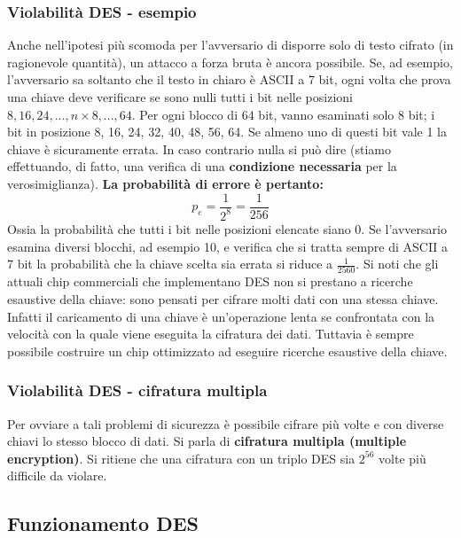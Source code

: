 \subsubsection{Violabilità DES - esempio}
Anche nell'ipotesi più scomoda per l'avversario di disporre solo di testo cifrato (in ragionevole quantità), un attacco a forza bruta è ancora possibile. Se, ad esempio, l'avversario sa soltanto che il testo in chiaro è ASCII a 7 bit, ogni volta che prova una chiave deve verificare se sono nulli tutti i bit nelle posizioni $8, 16, 24, ..., n \times 8, ..., 64$. Per ogni blocco di 64 bit, vanno esaminati solo 8 bit; i bit in posizione 8, 16, 24, 32, 40, 48, 56, 64. Se almeno uno di questi bit vale 1 la chiave è sicuramente errata. In caso contrario nulla si può dire (stiamo effettuando, di fatto, una verifica di una \textbf{condizione necessaria} per la verosimiglianza). \textbf{La probabilità di errore è pertanto:}
\begin{equation}
p_e = \frac{1}{2^8} = \frac{1}{256}
\end{equation}
Ossia la probabilità che tutti i bit nelle posizioni elencate siano 0. Se l'avversario esamina diversi blocchi, ad esempio 10, e verifica che si tratta sempre di ASCII a 7 bit la probabilità che la chiave scelta sia errata si riduce a $\frac{1}{2560}$. Si noti che gli attuali chip commerciali che implementano DES non si prestano a ricerche esaustive della chiave: sono pensati per cifrare molti dati con una stessa chiave. Infatti il caricamento di una chiave è un'operazione lenta se confrontata con la velocità con la quale viene eseguita la cifratura dei dati. Tuttavia è sempre possibile costruire un chip ottimizzato ad eseguire ricerche esaustive della chiave.

\subsubsection{Violabilità DES - cifratura multipla}
Per ovviare a tali problemi di sicurezza è possibile cifrare più volte e con diverse chiavi lo stesso blocco di dati. Si parla di \textbf{cifratura multipla (multiple encryption)}. Si ritiene che una cifratura con un triplo DES sia
$2^{56}$ volte più difficile da violare.

\subsection{Funzionamento DES}
